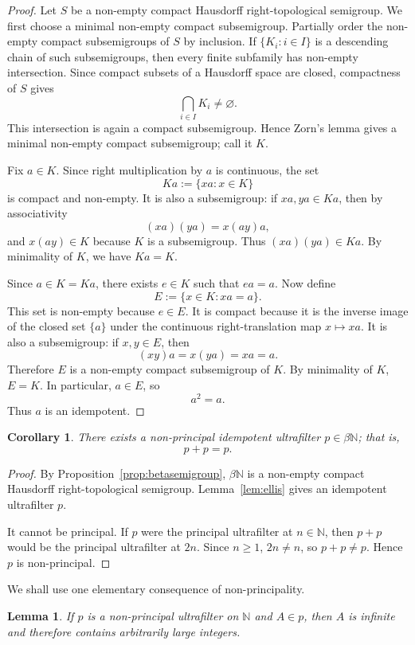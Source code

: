 \documentclass[11pt]{article}
\newtheorem{lemma}[theorem]{Lemma}
\newtheorem{corollary}[theorem]{Corollary}
\newcommand{\NN}{\mathbb N}
\begin{document}
\begin{proof}
Let $S$ be a non-empty compact Hausdorff right-topological semigroup. We first choose a minimal non-empty compact subsemigroup. Partially order the non-empty compact subsemigroups of $S$ by inclusion. If $\{K_i:i\in I\}$ is a descending chain of such subsemigroups, then every finite subfamily has non-empty intersection. Since compact subsets of a Hausdorff space are closed, compactness of $S$ gives
\[
    \bigcap_{i\in I}K_i\neq\varnothing.
\]
This intersection is again a compact subsemigroup. Hence Zorn's lemma gives a minimal non-empty compact subsemigroup; call it $K$.

Fix $a\in K$. Since right multiplication by $a$ is continuous, the set
\[
    Ka:=\{xa:x\in K\}
\]
is compact and non-empty. It is also a subsemigroup: if $x a,y a\in Ka$, then by associativity
\[
    (xa)(ya)=x(ay)a,
\]
and $x(ay)\in K$ because $K$ is a subsemigroup. Thus $(xa)(ya)\in Ka$. By minimality of $K$, we have $Ka=K$.

Since $a\in K=Ka$, there exists $e\in K$ such that $ea=a$. Now define
\[
    E:=\{x\in K:xa=a\}.
\]
This set is non-empty because $e\in E$. It is compact because it is the inverse image of the closed set $\{a\}$ under the continuous right-translation map $x\mapsto xa$. It is also a subsemigroup: if $x,y\in E$, then
\[
    (xy)a=x(ya)=xa=a.
\]
Therefore $E$ is a non-empty compact subsemigroup of $K$. By minimality of $K$, $E=K$. In particular, $a\in E$, so
\[
    a^2=a.
\]
Thus $a$ is an idempotent.
\end{proof}

\begin{corollary}\label{cor:idempotent}
There exists a non-principal idempotent ultrafilter $p\in\beta\NN$; that is,
\[
    p+p=p.
\]
\end{corollary}

\begin{proof}
By Proposition~\ref{prop:betasemigroup}, $\beta\NN$ is a non-empty compact Hausdorff right-topological semigroup. Lemma~\ref{lem:ellis} gives an idempotent ultrafilter $p$.

It cannot be principal. If $p$ were the principal ultrafilter at $n\in\NN$, then $p+p$ would be the principal ultrafilter at $2n$. Since $n\geq1$, $2n\neq n$, so $p+p\neq p$. Hence $p$ is non-principal.
\end{proof}

We shall use one elementary consequence of non-principality.

\begin{lemma}\label{lem:large}
If $p$ is a non-principal ultrafilter on $\NN$ and $A\in p$, then $A$ is infinite and therefore contains arbitrarily large integers.
\end{lemma}
\end{document}
